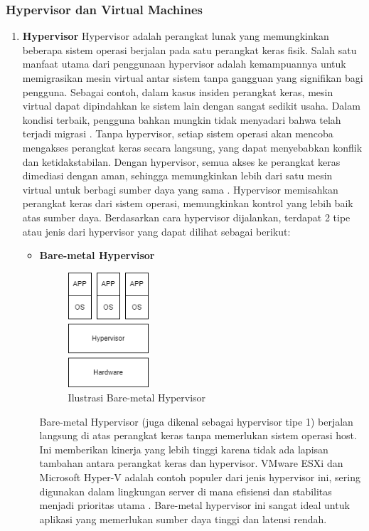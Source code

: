 \documentclass[12pt]{article}
\begin{document}
\subsubsection{Hypervisor dan Virtual Machines}
\begin{enumerate}
    \item \textbf{Hypervisor}
    \newline Hypervisor adalah perangkat lunak yang memungkinkan beberapa sistem operasi berjalan pada satu perangkat keras fisik. Salah satu manfaat utama dari penggunaan hypervisor adalah kemampuannya untuk memigrasikan mesin virtual antar sistem tanpa gangguan yang signifikan bagi pengguna. Sebagai contoh, dalam kasus insiden perangkat keras, mesin virtual dapat dipindahkan ke sistem lain dengan sangat sedikit usaha. Dalam kondisi terbaik, pengguna bahkan mungkin tidak menyadari bahwa telah terjadi migrasi \cite{satra2023}. Tanpa hypervisor, setiap sistem operasi akan mencoba mengakses perangkat keras secara langsung, yang dapat menyebabkan konflik dan ketidakstabilan. Dengan hypervisor, semua akses ke perangkat keras dimediasi dengan aman, sehingga memungkinkan lebih dari satu mesin virtual untuk berbagi sumber daya yang sama \cite{portnoy2012}. Hypervisor memisahkan perangkat keras dari sistem operasi, memungkinkan kontrol yang lebih baik atas sumber daya. Berdasarkan cara hypervisor dijalankan, terdapat 2 tipe atau jenis dari hypervisor yang dapat dilihat sebagai berikut:
    \begin{itemize}
        \item \textbf{Bare-metal Hypervisor}
        \begin{figure}[h]
            \centering
            \includegraphics[width=0.3\textwidth]{asset/hypervisor_tipe_1.png}
            \caption{Ilustrasi Bare-metal Hypervisor}
        \end{figure}
        Bare-metal Hypervisor (juga dikenal sebagai hypervisor tipe 1) berjalan langsung di atas perangkat keras tanpa memerlukan sistem operasi host. Ini memberikan kinerja yang lebih tinggi karena tidak ada lapisan tambahan antara perangkat keras dan hypervisor. VMware ESXi dan Microsoft Hyper-V adalah contoh populer dari jenis hypervisor ini, sering digunakan dalam lingkungan server di mana efisiensi dan stabilitas menjadi prioritas utama \cite{satra2023}. Bare-metal hypervisor ini sangat ideal untuk aplikasi yang memerlukan sumber daya tinggi dan latensi rendah.


\end{itemize}
\end{enumerate}
\end{document}
